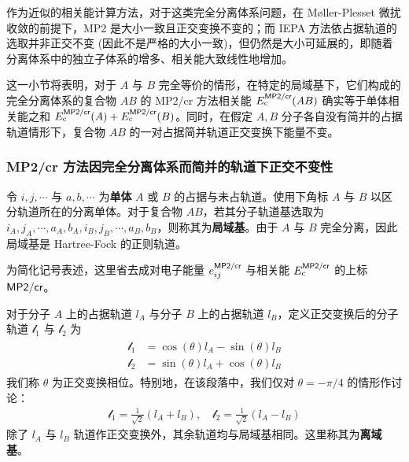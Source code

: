 作为近似的相关能计算方法，对于这类完全分离体系问题，在 M{\o}ller-Plesset 微扰收敛的前提下，MP2 是大小一致且正交变换不变的\cite{Szabo-Ostlund.Dover.1996, Shavitt-Bartlett.Cambridge.2009}；而 IEPA 方法依占据轨道的选取并非正交不变 (因此不是严格的大小一致)，但仍然是大小可延展的\cite{Szabo-Ostlund.Dover.1996, Zhang-Scheffler.NJP.2016}，即随着分离体系中的独立子体系的增多、相关能大致线性地增加。

这一小节将表明，对于 $A$ 与 $B$ 完全等价的情形，在特定的局域基下，它们构成的完全分离体系的复合物 $AB$ 的 MP2/cr 方法相关能 $E_\mathrm{c}^{\textsf{MP2/cr}} (AB)$ 确实等于单体相关能之和 $E_\mathrm{c}^{\textsf{MP2/cr}} (A) + E_\mathrm{c}^{\textsf{MP2/cr}} (B)$。同时，在假定 $A, B$ 分子各自没有简并的占据轨道情形下，复合物 $AB$ 的一对占据简并轨道正交变换下能量不变。

\subsubsection{MP2/cr 方法因完全分离体系而简并的轨道下正交不变性}

令 $i, j, \cdots$ 与 $a, b, \cdots$ 为\textbf{单体} $A$ 或 $B$ 的占据与未占轨道。使用下角标 $A$ 与 $B$ 以区分轨道所在的分离单体。对于复合物 $AB$，若其分子轨道基选取为 $i_A, j_A, \cdots, \allowbreak a_A, b_A, \allowbreak i_B, j_B, \cdots, \allowbreak a_B, b_B$，则称其为\textbf{局域基}。由于 $A$ 与 $B$ 完全分离，因此局域基是 Hartree-Fock 的正则轨道。

为简化记号表述，这里省去成对电子能量 $e_{ij}^{\textsf{MP2/cr}}$ 与相关能 $E_\mathrm{c}^{\textsf{MP2/cr}}$ 的上标 $\textsf{MP2/cr}$。

对于分子 $A$ 上的占据轨道 $l_A$ 与分子 $B$ 上的占据轨道 $l_B$，定义正交变换后的分子轨道 $\mathscr{l}_1$ 与 $\mathscr{l}_2$ 为
\begin{align}
  \label{eq.2.invariance-general}
  \begin{aligned}
    \mathscr{l}_1 &= \cos(\theta) l_A - \sin(\theta) l_B \\
    \mathscr{l}_2 &= \sin(\theta) l_A + \cos(\theta) l_B
  \end{aligned}
\end{align}
我们称 $\theta$ 为正交变换相位。特别地，在该段落中，我们仅对 $\theta = - \pi/4$ 的情形作讨论：
\begin{align}
  \label{eq.2.invariance-specific}
  \mathscr{l}_1 = \frac{1}{\sqrt{2}} (l_A + l_B), \quad \mathscr{l}_2 = \frac{1}{\sqrt{2}} (l_A - l_B)
\end{align}
除了 $l_A$ 与 $l_B$ 轨道作正交变换外，其余轨道均与局域基相同。这里称其为\textbf{离域基}。

